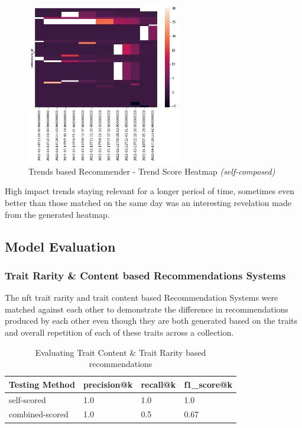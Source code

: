 \begin{figure}[h!]
\centering
\includegraphics[width=0.6\textwidth]{images/Testing/trends/trends-heatmap-30.png}
\caption{Trends based Recommender - Trend Score Heatmap \textit{(self-composed)}}
\label{fig:trends-recsys-heatmap30}
\end{figure}

\noindent High impact trends staying relevant for a longer period of time, sometimes even better than those matched on the same day was an interesting revelation made from the generated heatmap.

\subsection{Model Evaluation}

\subsubsection{Trait Rarity \& Content based Recommendations Systems}


The \gls{nft} trait rarity and trait content based Recommendation Systems were matched against each other to demonstrate the difference in recommendations produced by each other even though they are both generated based on the traits and overall repetition of each of these traits across a collection.

\begin{table}[h!]
\centering
\caption{Evaluating Trait Content \& Trait Rarity based recommendations}
\begin{tabular}{|l|l|l|l|}
\hline
\textbf{Testing Method} & \textbf{precision@k} &
\textbf{recall@k} & \textbf{f1\_score@k} \\
\hline
self-scored & 1.0 & 1.0 & 1.0 \\
\hline
combined-scored & 1.0 & 0.5 & 0.67\\
\hline
\end{tabular}
\end{table}

